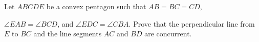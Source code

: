 Let 
$ABCDE$
 be a convex pentagon such that 
$AB=BC=CD$,
 
$\angle{EAB}=\angle{BCD}$,
 and 
$\angle{EDC}=\angle{CBA}$.
 Prove that the perpendicular line from 
$E$
 to 
$BC$
 and the line segments 
$AC$
 and 
$BD$
 are concurrent.
